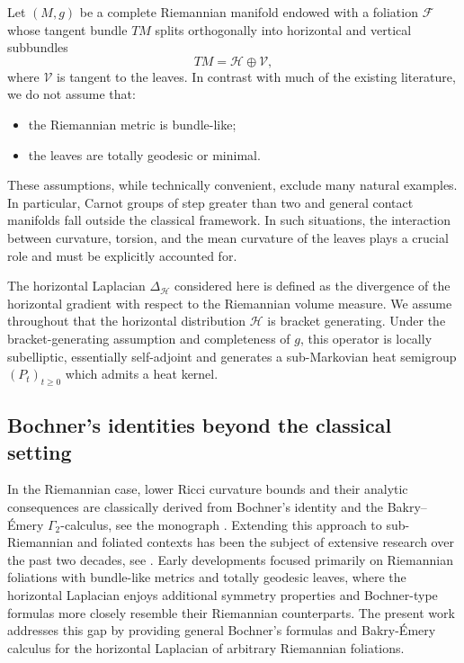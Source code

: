 \documentclass[11pt]{article}
\numberwithin{equation}{section}
\newcommand{\V}{\mathcal V}
\begin{document}
Let $(M,g)$ be a complete Riemannian manifold endowed with a foliation $\mathcal F$ whose tangent bundle $TM$ splits orthogonally into horizontal and vertical subbundles $$TM=\mathcal H\oplus\mathcal V,$$ 
where $\V$ is tangent to the leaves. In contrast with much of the existing literature, we do not assume that:
\begin{itemize}
    \item the Riemannian metric is bundle-like; 
    \item the leaves are totally geodesic or  minimal.
\end{itemize}
These assumptions, while technically convenient, exclude many natural examples. In particular, Carnot groups of step greater than two and general contact manifolds fall outside the classical framework. In such situations, the interaction between curvature, torsion, and the mean curvature of the leaves plays a crucial role and must be explicitly accounted for.

\medskip

The horizontal Laplacian $\Delta_{\mathcal H}$ considered here is defined as the divergence of the horizontal gradient with respect to the Riemannian volume measure. 
We assume throughout that the horizontal distribution $\mathcal H$ is bracket generating. Under the bracket-generating assumption and completeness of $g$, this operator is locally subelliptic, essentially self-adjoint and generates a sub-Markovian heat semigroup $(P_t)_{t\ge0}$ which admits a heat kernel. 



\subsection{Bochner's identities beyond the classical setting}

In the Riemannian case, lower Ricci curvature bounds and their analytic consequences are classically derived from Bochner’s identity and the Bakry–Émery  $\Gamma_2$-calculus, see the monograph \cite{BGL}. Extending this approach to sub-Riemannian and foliated contexts has been the subject of extensive research over the past two decades, see \cite{BaudoinEMS2014,BG17,BW14,GrTh16a, FYWbook}. Early developments focused primarily on Riemannian foliations with bundle-like metrics and totally geodesic leaves, where the horizontal Laplacian enjoys additional symmetry properties and Bochner-type formulas more closely resemble their Riemannian counterparts. The present work addresses this gap by providing  general Bochner's formulas and Bakry-\'Emery calculus for the horizontal Laplacian of arbitrary Riemannian foliations.
\end{document}
